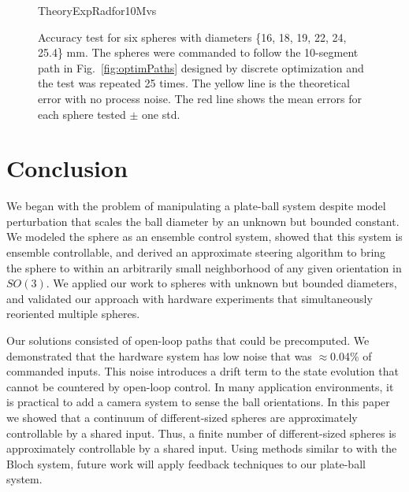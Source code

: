 \documentclass[letter paper, 10pt, conference]{ieeeconf}
\begin{document}
    	   \begin{figure}%
	\begin{center} %
		\begin{overpic}[width=.8\columnwidth]{TheoryExpRadfor10Mvs}\end{overpic}
		\vspace{-1.5em}
	\end{center}
	\caption{ \label{fig:OptimVsTheoretical} Accuracy test for six spheres with diameters \{16, 18, 19, 22, 24, 25.4\} mm.  The spheres were commanded to follow the 10-segment path in Fig.~\ref{fig:optimPaths} designed by discrete optimization and the test was repeated 25 times.  The yellow line is the theoretical error with no process noise.  The red line shows the mean errors for each sphere tested $\pm$ one std.
	}\vspace{-.5em}
	\end{figure}






\section{Conclusion}\label{sec:Conclusion}
We began with the problem of manipulating a plate-ball system despite model perturbation that scales the ball diameter by an unknown but bounded constant. We modeled the sphere as an ensemble control system, showed that this system is ensemble controllable, and derived an approximate steering algorithm to bring the sphere to within an arbitrarily small neighborhood of any given orientation in $SO(3)$. We applied our work to spheres with unknown but bounded diameters, and validated our approach with hardware experiments that simultaneously reoriented multiple spheres.  

Our solutions consisted of open-loop paths that could be precomputed.  We demonstrated that the hardware system has low noise that was $\approx$0.04\% of commanded inputs.  This noise introduces a drift term to the state evolution that cannot be countered by open-loop control.  In many application environments, it is practical to add a camera system to sense the ball orientations.  In this paper we showed that a continuum of different-sized spheres are approximately controllable by a shared input.  Thus, a finite number of different-sized spheres is approximately controllable by a shared input.  Using methods similar to \cite{Beauchard2010a} with the Bloch system,  future work will apply feedback techniques to our plate-ball system. 
\end{document}
